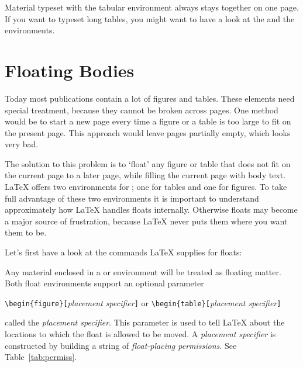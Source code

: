 Material typeset with the tabular environment always stays together on
one page. If you want to typeset long tables, you might want to have a
look at the  and the  environments.

\section{Floating Bodies}
Today most publications contain a lot of figures and tables. These
elements need special treatment, because they cannot be broken across
pages.  One method would be to start a new page every time a figure or
a table is too large to fit on the present page. This approach would
leave pages partially empty, which looks very bad.

The solution to this problem is to `float' any figure or table that
does not fit on the current page to a later page, while filling the
current page with body text. \LaTeX{} offers two environments for
; one for tables and  one for figures.  To
take full advantage of these two environments it is important to
understand approximately how \LaTeX{} handles floats internally.
Otherwise floats may become a major source of frustration, because
\LaTeX{} never puts them where you want them to be.

\bigskip
Let's first have a look at the commands \LaTeX{} supplies
for floats:

Any material enclosed in a  or  environment will
be treated as floating matter. Both float environments support an optional
parameter
\begin{lscommand}
\verb|\begin{figure}[|\emph{placement specifier}\verb|]| or
\verb|\begin{table}[|\emph{placement specifier}\verb|]|
\end{lscommand}
\noindent called the \emph{placement specifier}. This parameter
is used to tell \LaTeX{} about the locations to which the float
is allowed to be moved.  A \emph{placement specifier} is constructed by building a string
of \emph{float-placing permissions}. See Table~\ref{tab:permiss}.

